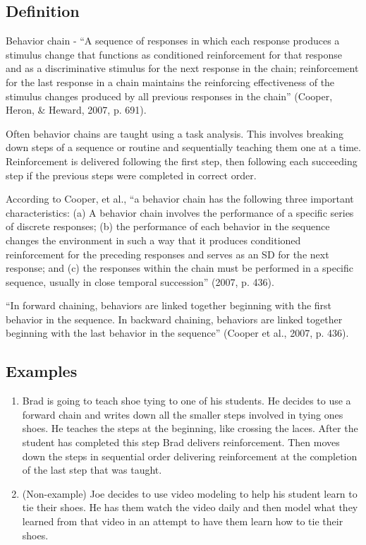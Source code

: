 \subsection{Definition}  
Behavior chain - ``A sequence of responses in which each response produces a stimulus change that functions as conditioned reinforcement for that response and as a discriminative stimulus for the next response in the chain; reinforcement for the last response in a chain maintains the reinforcing effectiveness of the stimulus changes produced by all previous responses in the chain'' (Cooper, Heron, \& Heward, 2007, p. 691).

Often behavior chains are taught using a task analysis. This involves breaking down steps of a sequence or routine and sequentially teaching them one at a time. Reinforcement is delivered following the first step, then following each succeeding step if the previous steps were completed in correct order.

According to Cooper, et al., ``a behavior chain has the following three important characteristics: (a) A behavior chain involves the performance of a specific series of discrete responses; (b) the performance of each behavior in the sequence changes the environment in such a way that it produces conditioned reinforcement for the preceding responses and serves as an SD  for the next response; and (c) the responses within the chain must be performed in a specific sequence, usually in close temporal succession'' (2007, p. 436).

``In forward chaining, behaviors are linked together beginning with the first behavior in the sequence. In backward chaining, behaviors are linked together beginning with the last behavior in the sequence'' (Cooper et al., 2007, p. 436). 

\subsection{Examples}
\begin{enumerate}
\item Brad is going to teach shoe tying to one of his students. He decides to use a forward chain and writes down all the smaller steps involved in tying ones shoes. He teaches the steps at the beginning, like crossing the laces. After the student has completed this step Brad delivers reinforcement.  Then moves down the steps in sequential order delivering reinforcement at the completion of the last step that was taught.
%
\item (Non-example) Joe decides to use video modeling to help his student learn to tie their shoes. He has them watch the video daily and then model what they learned from that video in an attempt to have them learn how to tie their shoes.
\end{enumerate}
%

